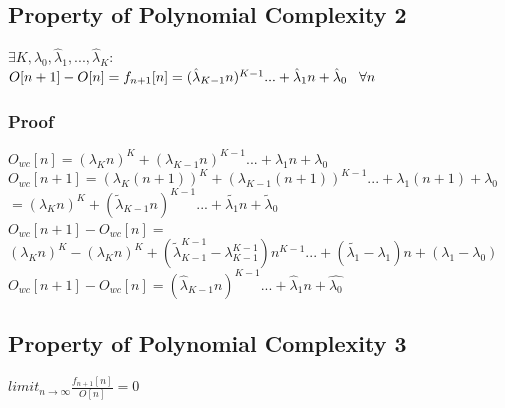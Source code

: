 \documentclass[11pt]{article}
\begin{document}
\subsection{Property of Polynomial Complexity 2}
\vspace{1mm}
\begin{center}
$
\exists K,\hat{\lambda}_0,\hat{\lambda}_1,...,\hat{\lambda}_{K} :
$
\\ \vspace{2mm}
$
O[n+1] - O[n] = f_{n+1}[n] = (\hat{\lambda}_{K-1} n)^{K-1}... + \hat{\lambda}_1 n + \hat{\lambda}_0 \hspace{3mm} \forall n
$
\end{center}



\subsubsection{Proof}
\vspace{1mm}
\begin{center}
$
O_{wc}[n] = (\lambda_K n)^K + (\lambda_{K-1} n)^{K-1}... + \lambda_1 n + \lambda_0
$
\\ \vspace{4mm}
$
O_{wc}[n+1] = (\lambda_K (n+1))^K + (\lambda_{K-1} (n+1))^{K-1}... + \lambda_1 (n+1) + \lambda_0
$
\\ \vspace{2mm}
$ 
=  (\lambda_K n)^K + (\tilde{\lambda}_{K-1} n)^{K-1}... + \tilde{\lambda_1} n + \tilde{\lambda}_0
$
\\ \vspace{6mm}
$
O_{wc}[n+1] - O_{wc}[n] = 
$
\\ \vspace{2mm}
$
(\lambda_K n)^K - (\lambda_K n)^K + (\tilde{\lambda}_{K-1}^{K-1}- \lambda_{K-1}^{K-1})n^{K-1}... + (\tilde{\lambda_1} - \lambda_1) n + (\lambda_1 - \lambda_0)
$
\\ \vspace{4mm}
$
O_{wc}[n+1] - O_{wc}[n] = (\hat{\lambda}_{K-1}n)^{K-1}... + \hat{\lambda}_1  n + \hat{\lambda_0}
$
\end{center}




\subsection{Property of Polynomial Complexity 3}
\vspace{1mm}
\begin{center}
$
limit_{n \rightarrow \infty } \frac{f_{n+1}[n]}{O[n]} = 0
$
\end{center}
\end{document}
